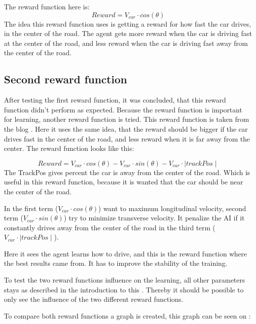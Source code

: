 The reward function here is:
\begin{equation}
Reward = V_{car} \cdot cos(\theta) 
\end{equation}
The idea this reward function uses is getting a reward for how fast the car drives, in the center of the road. The agent gets more reward when the car is driving fast at the center of the road, and less reward when the car is driving fast away from the center of the road. 

\subsection*{Second reward function}
After testing the first reward function, it was concluded, that this reward function didn't perform as expected. Because the reward function is important for learning, another reward function is tried. This reward function is taken from the blog \cite{DDPG_Torcs}. Here it uses the same idea, that the reward should be bigger if the car drives fast in the center of the road, and less reward when it is far away from the center. The reward function looks like this:

\begin{equation}
\label{eq:reward_2}
Reward = V_{car} \cdot cos(\theta) - V_{car} \cdot sin(\theta) - V_{car} \cdot \mid trackPos\mid 
\end{equation}
The TrackPos gives percent the car is away from the center of the road. Which is useful in this reward function, because it is wanted that the car should be near the center of the road.  

In  the first term ($V_{car} \cdot cos(\theta)$) want to maximum longitudinal velocity, second term ($V_{car} \cdot sin(\theta)$) try to minimize transverse velocity. It penalize the AI if it constantly drives away from the center of the road in the third term ($V_{car} \cdot \mid trackPos\mid$).

Here it sees the agent learns how to drive, and this is the reward function where the best results came from. It has to improve the stability of the training. 

To test the two reward functions influence on the learning, all other parameters stays as described in the introduction to this . Thereby it should be possible to only see the influence of the two different reward functions. 

To compare both reward functions a graph is created, this graph can be seen on :

